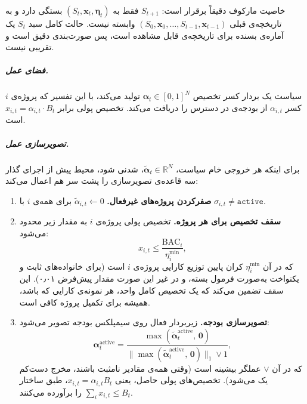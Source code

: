 خاصیت مارکوف دقیقاً برقرار است: $S_{t+1}$ فقط به
$(S_t, \mathbf{x}_t, \boldsymbol{\eta}_t)$ بستگی دارد و به تاریخچه‌ی
قبلی $(S_0, \mathbf{x}_0, \ldots, S_{t-1}, \mathbf{x}_{t-1})$ وابسته
نیست. حالت کامل سبد $S_t$ یک آماره‌ی بسنده برای تاریخچه‌ی قابل مشاهده
است، پس صورت‌بندی  دقیق است و تقریبی نیست.

\subparagraph{فضای عمل.}
سیاست یک بردار کسر تخصیص $\boldsymbol{\alpha}_t \in [0,1]^N$ تولید
می‌کند، با این تفسیر که پروژه‌ی $i$ کسر $\alpha_{i,t}$ از بودجه‌ی در
دسترس را دریافت می‌کند. تخصیص پولی برابر
$x_{i,t} = \alpha_{i,t} \cdot B_t$ است.

\subparagraph{تصویرسازی عمل.}
برای اینکه هر خروجی خام سیاست،
$\tilde{\boldsymbol{\alpha}}_t \in \mathbb{R}^N$، شدنی شود، محیط پیش
از اجرای گذار سه قاعده‌ی تصویرسازی را پشت سر هم اعمال می‌کند:

\begin{enumerate}[label=(\roman*)]
  \item \textbf{صفرکردن پروژه‌های غیرفعال.}
    $\tilde{\alpha}_{i,t} \leftarrow 0$ برای همه‌ی $i$ با
    $\sigma_{i,t} \neq \texttt{active}$.

  \item \textbf{سقف تخصیص برای هر پروژه.}
    تخصیص پولی پروژه‌ی $i$ به مقدار زیر محدود می‌شود:
    \begin{equation}
      x_{i,t} \leq \frac{\mathrm{BAC}_i}{\eta^{\min}_i},
      \label{eq:alloc_cap}
    \end{equation}
    که در آن $\eta^{\min}_i$ کران پایین توزیع کارایی پروژه‌ی $i$ است
    (برای خانواده‌های ثابت و یکنواخت به‌صورت فرمول بسته، و در غیر این
    صورت مقدار پیش‌فرض ۰٫۰۱). این سقف تضمین می‌کند که یک تخصیص کامل
    واحد، هر نمونه‌ی کارایی که باشد، همیشه برای تکمیل پروژه کافی است.

  \item \textbf{تصویرسازی بودجه.}
    زیربردار فعال روی سیمپلکس بودجه تصویر می‌شود:
    \begin{equation}
      \boldsymbol{\alpha}_t^{\mathrm{active}}
        = \frac{\max(\tilde{\boldsymbol{\alpha}}_t^{\mathrm{active}},\,\mathbf{0})}
               {\bigl\|\max(\tilde{\boldsymbol{\alpha}}_t^{\mathrm{active}},\,
                 \mathbf{0})\bigr\|_1 \vee 1},
      \label{eq:projection}
    \end{equation}
    که در آن $\vee$ عملگر بیشینه است (وقتی همه‌ی مقادیر نامثبت باشند،
    مخرج دست‌کم یک می‌شود). تخصیص‌های پولی حاصل، یعنی
    $x_{i,t} = \alpha_{i,t} B_t$، طبق ساختار
    $\sum_i x_{i,t} \leq B_t$ را برآورده می‌کنند.
\end{enumerate}

